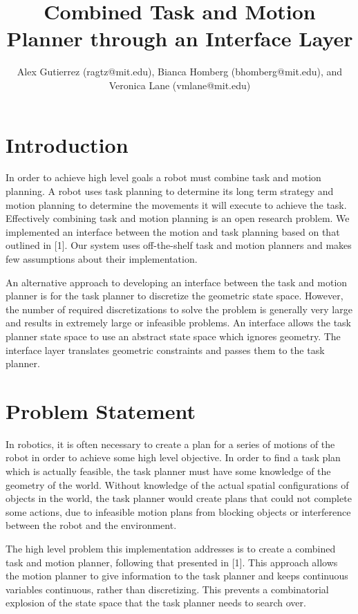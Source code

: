 \documentclass[12pt]{article}
\title{Combined Task and Motion Planner through an Interface Layer}
\author{Alex Gutierrez (ragtz@mit.edu), Bianca Homberg (bhomberg@mit.edu), and Veronica Lane (vmlane@mit.edu)}
\begin{document}
\maketitle

\section{Introduction}

In order to achieve high level goals a robot must combine task and motion planning. 
A robot uses task planning to determine its long term strategy and motion planning to determine the movements it  will execute to achieve the task. 
Effectively combining task and motion planning is an open research problem. 
We implemented an interface between the motion and task planning based on that outlined in [1]. 
Our system uses off-the-shelf task and motion planners and makes few assumptions about their implementation.
 
An alternative approach to developing an interface between the task and motion planner is for the task planner to discretize the geometric state space. 
However, the number of required discretizations to solve the problem is generally very large and results in extremely large or infeasible problems. 
An interface allows the task planner state space to use an abstract state space which ignores geometry. 
The interface layer translates geometric constraints and passes them to the task planner.

\section{Problem Statement}

In robotics, it is often necessary to create a plan for a series of motions of the robot in order to achieve some high level objective.
In order to find a task plan which is actually feasible, the task planner must have some knowledge of the geometry of the world.
Without knowledge of the actual spatial configurations of objects in the world, the task planner would create plans that could not complete some actions, due to infeasible motion plans from blocking objects or interference between the robot and the environment.

The high level problem this implementation addresses is to create a combined task and motion planner, following that presented in [1].  
This approach allows the motion planner to give information to the task planner and keeps continuous variables continuous, rather than discretizing.  
This prevents a combinatorial explosion of the state space that the task planner needs to search over.
\end{document}

